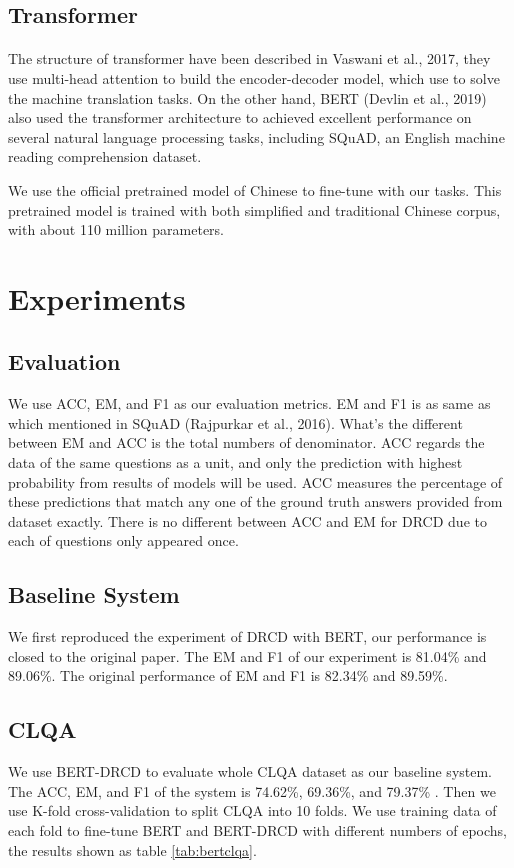 \documentclass{article}
\begin{document}
\subsection{Transformer}
\paragraph{}
The structure of transformer\cite{vaswani2017attention} have been described in Vaswani et al., 2017, they use multi-head attention to build the encoder-decoder model, which use to solve the machine translation tasks. On the other hand, BERT\cite{devlin2018bert} (Devlin et al., 2019) also used the transformer architecture to achieved excellent performance on several natural language processing tasks, including SQuAD, an English machine reading comprehension dataset.

We use the official pretrained model of Chinese to fine-tune with our tasks. This pretrained model is trained with both simplified and traditional Chinese corpus, with about 110 million parameters.

\section{Experiments}
\subsection{Evaluation}
We use ACC, EM, and F1 as our evaluation metrics. EM and F1 is as same as which mentioned in SQuAD\cite{rajpurkar2016squad} (Rajpurkar et al., 2016). What's the different between EM and ACC is the total numbers of denominator. ACC regards the data of the same questions as a unit, and only the prediction with highest probability from results of models will be used. ACC measures the percentage of these predictions that match any one of the ground truth answers provided from dataset exactly. There is no different between ACC and EM for DRCD due to each of questions only appeared once.

\subsection{Baseline System}
We first reproduced the experiment of DRCD with BERT, our performance is closed to the original paper. The EM and F1 of our experiment is 81.04\% and 89.06\%. The original performance of EM and F1 is 82.34\% and 89.59\%.

\subsection{CLQA}
We use BERT-DRCD to evaluate whole CLQA dataset as our baseline system. The ACC, EM, and F1 of the system is 74.62\%, 69.36\%, and 79.37\% . Then we use K-fold cross-validation to split CLQA into 10 folds. We use training data of each fold to fine-tune BERT and BERT-DRCD with different numbers of epochs, the results shown as table \ref{tab:bertclqa}.
\end{document}
